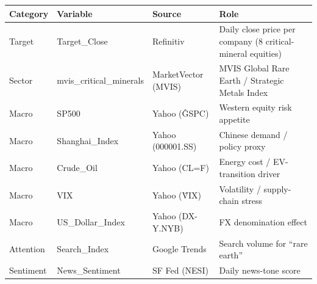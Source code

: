 \begin{tabular}{lllp{6cm}}
\toprule
Category & Variable & Source & Role \\
\midrule
Target & Target\_Close & Refinitiv & Daily close price per company (8 critical-mineral equities) \\
Sector & mvis\_critical\_minerals & MarketVector (MVIS) & MVIS Global Rare Earth / Strategic Metals Index \\
Macro & SP500 & Yahoo (\^GSPC) & Western equity risk appetite \\
Macro & Shanghai\_Index & Yahoo (000001.SS) & Chinese demand / policy proxy \\
Macro & Crude\_Oil & Yahoo (CL=F) & Energy cost / EV-transition driver \\
Macro & VIX & Yahoo (\^VIX) & Volatility / supply-chain stress \\
Macro & US\_Dollar\_Index & Yahoo (DX-Y.NYB) & FX denomination effect \\
Attention & Search\_Index & Google Trends & Search volume for ``rare earth'' \\
Sentiment & News\_Sentiment & SF Fed (NESI) & Daily news-tone score \\
\bottomrule
\end{tabular}

